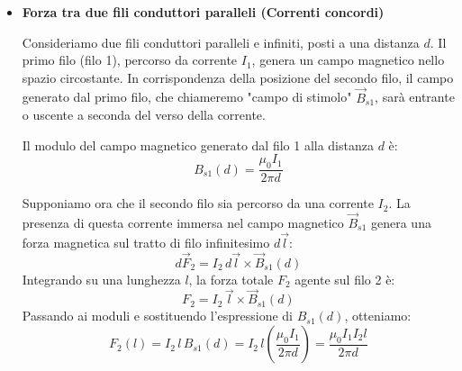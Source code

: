 \documentclass{book}
\begin{document}
\begin{itemize}
Si consideri un filo percorso da corrente che termina perpendicolarmente su una piastra metallica illimitata. Per calcolare il campo magnetico prodotto, utilizziamo la legge di Ampère lungo una circonferenza $\gamma$ di raggio $R$ centrata sul filo. Per simmetria, il campo $\vec{B}$ sarà tangente ad ogni punto della circonferenza e costante in modulo:

$$
\oint_\gamma \vec{B}(\vec{r})\cdot d\vec{l} = \oint B(R)\, dl = B(R) \cdot 2\pi R
$$

Secondo il teorema di Ampère (o applicando il teorema di Stokes per legare la circuitazione al flusso della densità di corrente $\vec{J}_f$), questo integrale è uguale alla permeabilità magnetica per la corrente concatenata:

$$
\int_S \vec{\nabla}\times\vec{B}(\vec{r})\cdot\hat{n}\,dS = \mu_0 \int_S \vec{J}_f(\vec{r})\cdot\hat{n}\,dS = \mu_0 I
$$

Eguagliando i risultati ($B(R) \cdot 2\pi R = \mu_0 I$), possiamo ricavare il modulo del campo magnetico:
$$
B(R) = \frac{\mu_0 I}{2\pi R}
$$
Inoltre, in base alla geometria del sistema, si osserva che il campo all'interno della cavità (o nella regione non interessata dalla corrente dietro la distribuzione) sarà nullo.

\item 
\textbf{Forza tra due fili conduttori paralleli (Correnti concordi)}

Consideriamo due fili conduttori paralleli e infiniti, posti a una distanza $d$.
Il primo filo (filo 1), percorso da corrente $I_1$, genera un campo magnetico nello spazio circostante. In corrispondenza della posizione del secondo filo, il campo generato dal primo filo, che chiameremo "campo di stimolo" $\vec{B}_{s1}$, sarà entrante o uscente a seconda del verso della corrente.

Il modulo del campo magnetico generato dal filo 1 alla distanza $d$ è:
$$
B_{s1}(d) = \frac{\mu_0 I_1}{2\pi d}
$$

Supponiamo ora che il secondo filo sia percorso da una corrente $I_2$. La presenza di questa corrente immersa nel campo magnetico $\vec{B}_{s1}$ genera una forza magnetica sul tratto di filo infinitesimo $d\vec{l}$:
$$
d\vec{F}_2 = I_2 \, d\vec{l} \times \vec{B}_{s1}(d)
$$
Integrando su una lunghezza $l$, la forza totale $F_2$ agente sul filo 2 è:
$$
F_2 = I_2 \, \vec{l} \times \vec{B}_{s1}(d)
$$
Passando ai moduli e sostituendo l'espressione di $B_{s1}(d)$, otteniamo:
$$
F_2(l) = I_2 \, l \, B_{s1}(d) = I_2 \, l \left( \frac{\mu_0 I_1}{2\pi d} \right) = \frac{\mu_0 I_1 I_2 l}{2 \pi d}
$$


\end{itemize}
\end{document}
